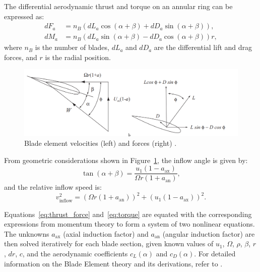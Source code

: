 The differential aerodynamic thrust and torque on an annular ring can be expressed as:
\begin{align}
    dF_a &= n_B \left( dL_a \cos(\alpha + \beta) + dD_a \sin(\alpha + \beta) \right), \label{eq:thrust_force} \\
    dM_a &= n_B \left( dL_a \sin(\alpha + \beta) - dD_a \cos(\alpha + \beta) \right) r, \label{eq:torque}
\end{align}
where $n_B$ is the number of blades, $dL_a$ and $dD_a$ are the differential lift and drag forces, and $r$ is the radial position.
\begin{figure}[ht]
    \centering
    \includegraphics[width=\textwidth]{Figures/blade_element.png}
    \caption{Blade element velocities (left) and forces (right) \cite{burton2011}.}
    \label{fig:blade_geometry}
\end{figure}

From geometric considerations shown in Figure~\ref{fig:blade_geometry}, the inflow angle is given by:
\begin{equation}
    \tan(\alpha + \beta) = \frac{u_1(1 - a_{\text{ax}})}{\Omega r (1 + a_{\text{an}})},
\end{equation}
and the relative inflow speed is:
\begin{equation}
    v_{\text{inflow}}^2 = \left( \Omega r (1 + a_{\text{an}}) \right)^2 + \left( u_1 (1 - a_{\text{ax}}) \right)^2. \label{eq:inflow_speed}
\end{equation}

Equations~\eqref{eq:thrust_force} and~\eqref{eq:torque} are equated with the corresponding expressions from momentum theory to form a system of two nonlinear equations. The unknowns $a_{\text{ax}}$ (axial induction factor) and $a_{\text{an}}$ (angular induction factor) are then solved iteratively for each blade section, given known values of $u_1$, $\Omega$, $\rho$, $\beta$, $r$, $dr$, $c$, and the aerodynamic coefficients $c_L(\alpha)$ and $c_D(\alpha)$.
For detailed information on the Blade Element theory and its derivations, refer to \cite{ingram2011blade}.


